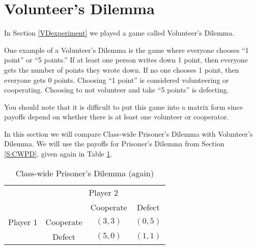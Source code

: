
\section{Volunteer's Dilemma}




In Section \ref{VDexperiment} we played a game called Volunteer's Dilemma. 
\begin{example}\label{E:VDpoints}
One example of a Volunteer's Dilemma is the game where everyone chooses ``1 point'' or ``5 points.'' If at least one person writes down 1 point, then everyone gets the number of points they wrote down. If no one chooses 1 point, then everyone gets 0 points. Choosing ``1 point'' is considered volunteering or cooperating. Choosing to not volunteer and take ``5 points'' is defecting.

You should note that it is difficult to put this game into a matrix form since payoffs depend on whether there is at least one volunteer or cooperator. 
\end{example}

In this section we will compare Class-wide Prisoner's Dilemma with Volunteer's Dilemma. We will use the payoffs for Prisoner's Dilemma from Section \ref{S:CWPD}, given again in Table \ref{T:CWPD2}.



\begin{table}[h]
\centering

\begin{tabular}{cccc}
                      & \multicolumn{3}{c}{Player 2}                                                  \\ \cline{2-4} 
\multicolumn{1}{l|}{} & \multicolumn{1}{l|}{} & \multicolumn{1}{c|}{Cooperate} & \multicolumn{1}{c|}{Defect} \\ \cline{2-4} 
\multicolumn{1}{l|}{Player 1} & \multicolumn{1}{c|}{Cooperate} & \multicolumn{1}{c|}{$(3, 3)$} & \multicolumn{1}{c|}{$(0, 5)$} \\ \cline{2-4} 
\multicolumn{1}{l|}{} & \multicolumn{1}{c|}{Defect} & \multicolumn{1}{c|}{$(5, 0)$} & \multicolumn{1}{c|}{$(1, 1)$} \\ \cline{2-4} 
\end{tabular}
\caption{Class-wide Prisoner's Dilemma (again)}
\label{T:CWPD2}
\end{table}


